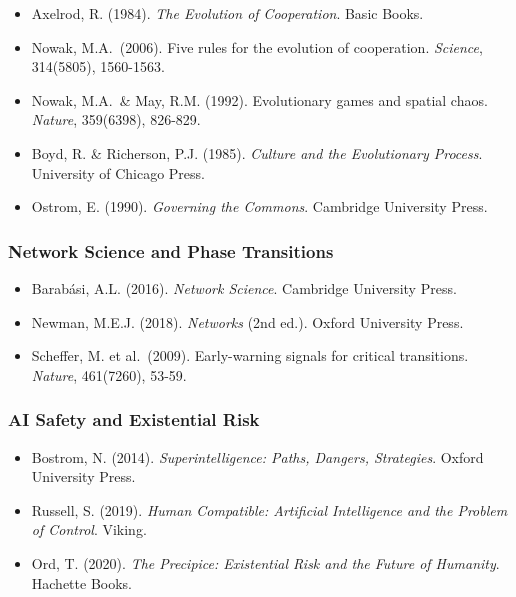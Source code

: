 \documentclass[11pt,letterpaper]{article}
\providecommand{\tightlist}{%
  \setlength{\itemsep}{0pt}\setlength{\parskip}{0pt}}
\begin{document}
\begin{itemize}
\tightlist
\item
  Axelrod, R. (1984). \emph{The Evolution of Cooperation}. Basic Books.
\item
  Nowak, M.A.~(2006). Five rules for the evolution of cooperation.
  \emph{Science}, 314(5805), 1560-1563.
\item
  Nowak, M.A.~\& May, R.M. (1992). Evolutionary games and spatial chaos.
  \emph{Nature}, 359(6398), 826-829.
\item
  Boyd, R. \& Richerson, P.J. (1985). \emph{Culture and the Evolutionary
  Process}. University of Chicago Press.
\item
  Ostrom, E. (1990). \emph{Governing the Commons}. Cambridge University
  Press.
\end{itemize}

\subsubsection{Network Science and Phase
Transitions}\label{network-science-and-phase-transitions}

\begin{itemize}
\tightlist
\item
  Barabási, A.L. (2016). \emph{Network Science}. Cambridge University
  Press.
\item
  Newman, M.E.J. (2018). \emph{Networks} (2nd ed.). Oxford University
  Press.
\item
  Scheffer, M. et al.~(2009). Early-warning signals for critical
  transitions. \emph{Nature}, 461(7260), 53-59.
\end{itemize}

\subsubsection{AI Safety and Existential
Risk}\label{ai-safety-and-existential-risk}

\begin{itemize}
\tightlist
\item
  Bostrom, N. (2014). \emph{Superintelligence: Paths, Dangers,
  Strategies}. Oxford University Press.
\item
  Russell, S. (2019). \emph{Human Compatible: Artificial Intelligence
  and the Problem of Control}. Viking.
\item
  Ord, T. (2020). \emph{The Precipice: Existential Risk and the Future
  of Humanity}. Hachette Books.
\end{itemize}
\end{document}

